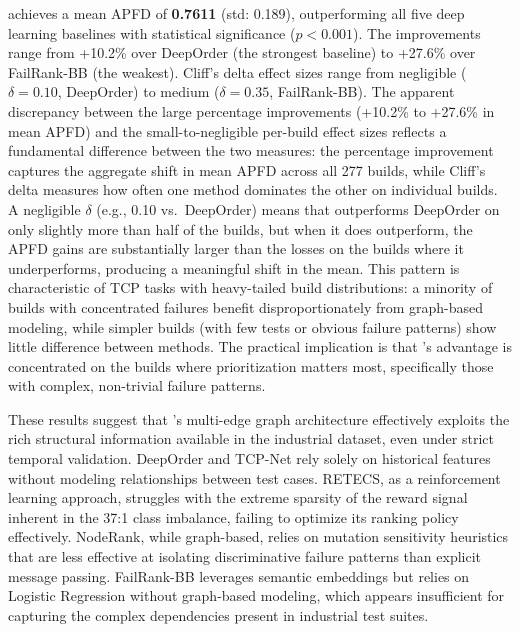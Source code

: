 \filopriori{} achieves a mean APFD of \textbf{0.7611} (std: 0.189),
outperforming all five deep learning baselines with statistical significance
($p < 0.001$). The improvements range from +10.2\% over DeepOrder (the
strongest baseline) to +27.6\% over FailRank-BB (the weakest).
Cliff's delta effect sizes range from negligible ($\delta = 0.10$, DeepOrder)
to medium ($\delta = 0.35$, FailRank-BB). The apparent discrepancy between
the large percentage improvements (+10.2\% to +27.6\% in mean APFD) and the
small-to-negligible per-build effect sizes reflects a fundamental difference
between the two measures: the percentage improvement captures the aggregate
shift in mean APFD across all 277 builds, while Cliff's delta measures how
often one method dominates the other on individual builds. A negligible
$\delta$ (e.g., 0.10 vs.\ DeepOrder) means that \filopriori{} outperforms
DeepOrder on only slightly more than half of the builds, but when it does
outperform, the APFD gains are substantially larger than the losses on the
builds where it underperforms, producing a meaningful shift in the mean.
This pattern is characteristic of TCP tasks with heavy-tailed build
distributions: a minority of builds with concentrated failures benefit
disproportionately from graph-based modeling, while simpler builds (with
few tests or obvious failure patterns) show little difference between methods.
The practical implication is that \filopriori{}'s advantage is concentrated on
the builds where prioritization matters most, specifically those with complex, non-trivial
failure patterns.

These results suggest that \filopriori{}'s multi-edge graph architecture effectively
exploits the rich structural information available in the
industrial dataset, even under strict temporal validation. DeepOrder and TCP-Net rely solely on historical features
without modeling relationships between test cases. RETECS, as a reinforcement
learning approach, struggles with the extreme sparsity of the reward signal inherent
in the 37:1 class imbalance, failing to optimize its ranking policy effectively. NodeRank,
while graph-based, relies on mutation sensitivity heuristics that are less effective at
isolating discriminative failure patterns than explicit message passing. FailRank-BB leverages semantic embeddings but relies on
Logistic Regression without graph-based modeling, which appears insufficient for
capturing the complex dependencies present in industrial test suites.

